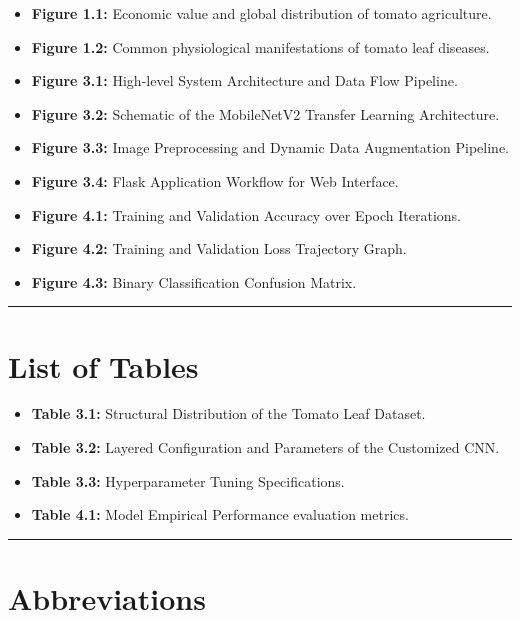 \documentclass[
]{article}
\providecommand{\tightlist}{%
  \setlength{\itemsep}{0pt}\setlength{\parskip}{0pt}}
\begin{document}
\begin{itemize}
\tightlist
\item
  \textbf{Figure 1.1:} Economic value and global distribution of tomato
  agriculture.
\item
  \textbf{Figure 1.2:} Common physiological manifestations of tomato
  leaf diseases.
\item
  \textbf{Figure 3.1:} High-level System Architecture and Data Flow
  Pipeline.
\item
  \textbf{Figure 3.2:} Schematic of the MobileNetV2 Transfer Learning
  Architecture.
\item
  \textbf{Figure 3.3:} Image Preprocessing and Dynamic Data Augmentation
  Pipeline.
\item
  \textbf{Figure 3.4:} Flask Application Workflow for Web Interface.
\item
  \textbf{Figure 4.1:} Training and Validation Accuracy over Epoch
  Iterations.
\item
  \textbf{Figure 4.2:} Training and Validation Loss Trajectory Graph.
\item
  \textbf{Figure 4.3:} Binary Classification Confusion Matrix.
\end{itemize}

\begin{center}\rule{0.5\linewidth}{0.5pt}\end{center}

\section{List of Tables}\label{list-of-tables}

\begin{itemize}
\tightlist
\item
  \textbf{Table 3.1:} Structural Distribution of the Tomato Leaf
  Dataset.
\item
  \textbf{Table 3.2:} Layered Configuration and Parameters of the
  Customized CNN.
\item
  \textbf{Table 3.3:} Hyperparameter Tuning Specifications.
\item
  \textbf{Table 4.1:} Model Empirical Performance evaluation metrics.
\end{itemize}

\begin{center}\rule{0.5\linewidth}{0.5pt}\end{center}

\section{Abbreviations}\label{abbreviations}
\end{document}
